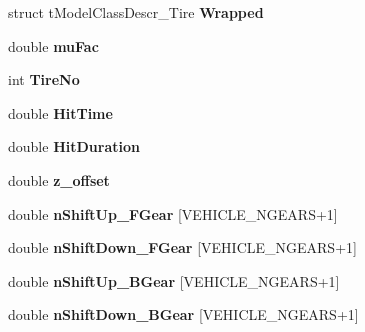 \begin{DoxyCompactItemize}
\begin{tabbing}
\end{tabbing}\item 
\mbox{\label{structt_my_model_a464d4702adbf660c6168dfe091302124}} 
struct t\+Model\+Class\+Descr\+\_\+\+Tire {\bfseries Wrapped}
\item 
\mbox{\label{structt_my_model_a1b7e8cc08eacf76b9928198af2041b92}} 
double {\bfseries mu\+Fac}
\item 
\mbox{\label{structt_my_model_a6e96b5285b6253094efb291f5b14d771}} 
int {\bfseries Tire\+No}
\item 
\mbox{\label{structt_my_model_a475b7ab4c86ec974bc08fa93808995e0}} 
double {\bfseries Hit\+Time}
\item 
\mbox{\label{structt_my_model_af6b6f53143cdfd8c9eaa22d2a167be17}} 
double {\bfseries Hit\+Duration}
\item 
\mbox{\label{structt_my_model_ac917c6aa9576cf1ac8256477a530980d}} 
double {\bfseries z\+\_\+offset}
\item 
\mbox{\label{structt_my_model_aa15a9a9f6b95185dbc719459e8be6f91}} 
double {\bfseries n\+Shift\+Up\+\_\+\+F\+Gear} \mbox{[}V\+E\+H\+I\+C\+L\+E\+\_\+\+N\+G\+E\+A\+RS+1\mbox{]}
\item 
\mbox{\label{structt_my_model_a55db8a44b488f5017c70112a36d3a27e}} 
double {\bfseries n\+Shift\+Down\+\_\+\+F\+Gear} \mbox{[}V\+E\+H\+I\+C\+L\+E\+\_\+\+N\+G\+E\+A\+RS+1\mbox{]}
\item 
\mbox{\label{structt_my_model_aa9c52137a54f0fbe49ca48c339655b0b}} 
double {\bfseries n\+Shift\+Up\+\_\+\+B\+Gear} \mbox{[}V\+E\+H\+I\+C\+L\+E\+\_\+\+N\+G\+E\+A\+RS+1\mbox{]}
\item 
\mbox{\label{structt_my_model_a9e64c633dacd410390d859d3270f3f5e}} 
double {\bfseries n\+Shift\+Down\+\_\+\+B\+Gear} \mbox{[}V\+E\+H\+I\+C\+L\+E\+\_\+\+N\+G\+E\+A\+RS+1\mbox{]}
\item 
\mbox{\label{structt_my_model_a1b66126aae4737f04f0eff408d5d0045}} 

\end{DoxyCompactItemize}
